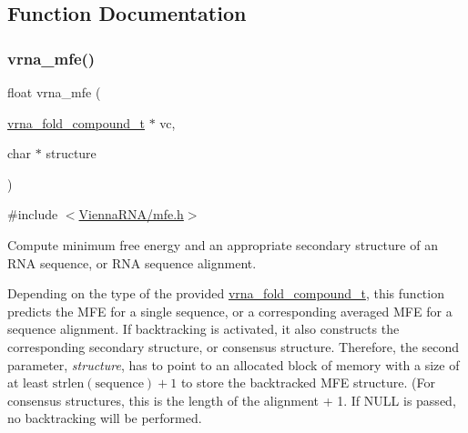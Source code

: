 \subsection{Function Documentation}
\mbox{\label{group__mfe__fold_gabd3b147371ccf25c577f88bbbaf159fd}} 
\subsubsection{\texorpdfstring{vrna\+\_\+mfe()}{vrna\_mfe()}}
{\footnotesize\ttfamily float vrna\+\_\+mfe (\begin{DoxyParamCaption}\item[{\hyperlink{group__fold__compound_ga1b0cef17fd40466cef5968eaeeff6166}{vrna\+\_\+fold\+\_\+compound\+\_\+t} $\ast$}]{vc,  }\item[{char $\ast$}]{structure }\end{DoxyParamCaption})}



{\ttfamily \#include $<$\hyperlink{mfe_8h}{Vienna\+R\+N\+A/mfe.\+h}$>$}



Compute minimum free energy and an appropriate secondary structure of an R\+NA sequence, or R\+NA sequence alignment. 

Depending on the type of the provided \hyperlink{group__fold__compound_ga1b0cef17fd40466cef5968eaeeff6166}{vrna\+\_\+fold\+\_\+compound\+\_\+t}, this function predicts the M\+FE for a single sequence, or a corresponding averaged M\+FE for a sequence alignment. If backtracking is activated, it also constructs the corresponding secondary structure, or consensus structure. Therefore, the second parameter, {\itshape structure}, has to point to an allocated block of memory with a size of at least $\mathrm{strlen}(\mathrm{sequence})+1$ to store the backtracked M\+FE structure. (For consensus structures, this is the length of the alignment + 1. If {\ttfamily N\+U\+LL} is passed, no backtracking will be performed.

